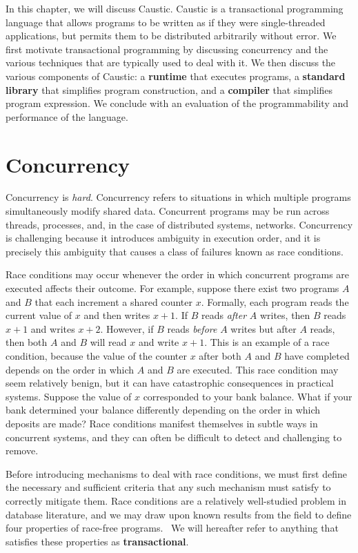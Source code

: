 \documentclass[../main.tex]{subfiles}
\begin{document}
In this chapter, we will discuss Caustic. Caustic is a transactional programming language that
allows programs to be written as if they were single-threaded applications, but permits them to be
distributed arbitrarily without error. We first motivate transactional programming by
discussing concurrency and the various techniques that are typically used to deal with it. We
then discuss the various components of Caustic: a \textbf{runtime} that executes programs, a
\textbf{standard library} that simplifies program construction, and a \textbf{compiler} that
simplifies program expression. We conclude with an evaluation of the programmability and
performance of the language.

\section{Concurrency}
Concurrency is \emph{hard}. Concurrency refers to situations in which multiple programs
simultaneously modify shared data. Concurrent programs may be run across threads, processes,
and, in the case of distributed systems, networks. Concurrency is challenging because it
introduces ambiguity in execution order, and it is precisely this ambiguity that causes a class of
failures known as race conditions.

Race conditions may occur whenever the order in which concurrent programs are executed affects their
outcome. For example, suppose there exist two programs $A$ and $B$ that each increment a shared
counter $x$. Formally, each program reads the current value of $x$ and then writes $x + 1$. If
$B$ reads \emph{after} $A$ writes, then $B$ reads $x + 1$ and writes $x + 2$. However, if $B$ reads
\emph{before} $A$ writes but after $A$ reads, then both $A$ and $B$ will read $x$ and write $x + 1$.
This is an example of a race condition, because the value of the counter $x$ after both $A$ and $B$
have completed depends on the order in which $A$ and $B$ are executed. This race condition may seem
relatively benign, but it can have catastrophic consequences in practical systems. Suppose the value
of $x$ corresponded to your bank balance. What if your bank determined your balance differently
depending on the order in which deposits are made? Race conditions manifest themselves in subtle
ways in concurrent systems, and they can often be difficult to detect and challenging to remove.

Before introducing mechanisms to deal with race conditions, we must first define the necessary and
sufficient criteria that any such mechanism must satisfy to correctly mitigate them. Race conditions
are a relatively well-studied problem in database literature, and we may draw upon known results
from the field to define four properties of race-free programs.~\cite{transactions} We will
hereafter refer to anything that satisfies these properties as \textbf{transactional}.
\end{document}
